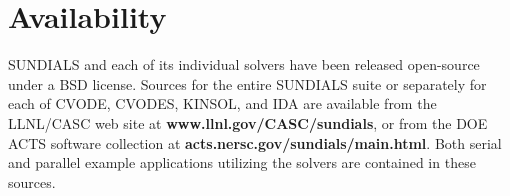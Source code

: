 \section{Availability}
\label{s:availability}

SUNDIALS and each of its individual solvers have been released open-source
under a BSD license.
Sources for the entire SUNDIALS suite or separately for each of CVODE, 
CVODES, KINSOL, and IDA are available from the LLNL/CASC web site at
\newline \hspace*{.5in} {\bf www.llnl.gov/CASC/sundials},
\newline or from the DOE ACTS software collection at
\newline \hspace*{.5in} {\bf acts.nersc.gov/sundials/main.html}.
Both serial and parallel example applications utilizing the solvers 
are contained in these sources. 





